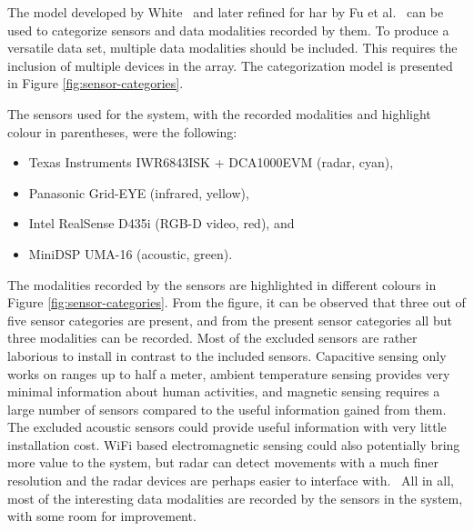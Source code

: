 The model developed by White~\cite{white87} and later refined for \gls{har} by Fu et al.~\cite{sensing-survey} 
can be used to categorize sensors and data modalities recorded by them.
To produce a versatile data set, 
multiple data modalities should be included.
This requires the inclusion of multiple devices in the array.
The categorization model is presented in Figure \ref{fig:sensor-categories}.

The sensors used for the system, with the recorded modalities and highlight colour in parentheses,
were the following:
\begin{itemize}
    \item Texas Instruments IWR6843ISK + DCA1000EVM (radar, cyan),
    \item Panasonic Grid-EYE (infrared, yellow),
    \item Intel RealSense D435i (RGB-D video, red), and
    \item MiniDSP UMA-16 (acoustic, green).
\end{itemize}

The modalities recorded by the sensors are highlighted in different colours in Figure \ref{fig:sensor-categories}.
From the figure, it can be observed that three out of five sensor categories are present,
and from the present sensor categories all but three modalities can be recorded.
Most of the excluded sensors are rather laborious to install in contrast to the included sensors.
Capacitive sensing only works on ranges up to half a meter,
ambient temperature sensing provides very minimal information about human activities,
and magnetic sensing requires a large number of sensors compared to the useful information gained from them.
The excluded acoustic sensors could provide useful information with very little installation cost.
WiFi based electromagnetic sensing could also potentially bring more value to the system,
but radar can detect movements with a much finer resolution and the radar devices are perhaps easier to interface with.~\cite{sensing-survey}
All in all, most of the interesting data modalities are recorded by the sensors in the system,
with some room for improvement.

